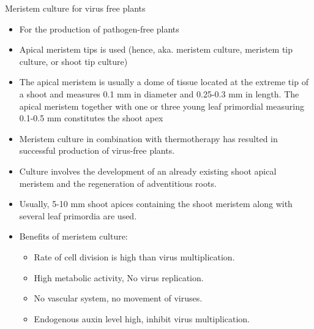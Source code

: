 \documentclass[
  ignorenonframetext,
  aspectratio=169]{beamer}
\providecommand{\tightlist}{%
  \setlength{\itemsep}{0pt}\setlength{\parskip}{0pt}}
\begin{document}
\begin{frame}{Meristem culture for virus free plants}
\begin{itemize}
\tightlist
\item
  For the production of pathogen-free plants
\item
  Apical meristem tips is used (hence, aka. meristem culture, meristem
  tip culture, or shoot tip culture)
\item
  The apical meristem is usually a dome of tissue located at the extreme
  tip of a shoot and measures 0.1 mm in diameter and 0.25-0.3 mm in
  length. The apical meristem together with one or three young leaf
  primordial measuring 0.1-0.5 mm constitutes the shoot apex
\item
  Meristem culture in combination with thermotherapy has resulted in
  successful production of virus-free plants.
\item
  Culture involves the development of an already existing shoot apical
  meristem and the regeneration of adventitious roots.
\item
  Usually, 5-10 mm shoot apices containing the shoot meristem along with
  several leaf primordia are used.
\end{itemize}
\end{frame}

\begin{frame}{}
\protect\hypertarget{section-8}{}
\begin{itemize}
\tightlist
\item
  Benefits of meristem culture:

  \begin{itemize}
  \tightlist
  \item
    Rate of cell division is high than virus multiplication.
  \item
    High metabolic activity, No virus replication.
  \item
    No vascular system, no movement of viruses.
  \item
    Endogenous auxin level high, inhibit virus multiplication.
  \end{itemize}
\end{itemize}
\end{frame}
\end{document}

